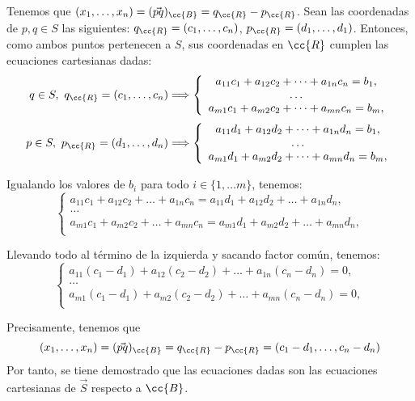 \begin{ejercicio}
    Tenemos que $(x_1,\dots,x_n)=(\vec{pq})_{\cc{B}}=q_{\cc{R}}-p_{\cc{R}}$. Sean las coordenadas de $p,q\in S$ las siguientes: $q_{\cc{R}}=(c_1,\dots,c_n)$, $p_{\cc{R}}=(d_1,\dots,d_1)$. Entonces, como ambos puntos pertenecen a $S$, sus coordenadas en $\cc{R}$ cumplen las ecuaciones cartesianas dadas:
    \begin{equation*}
        q\in S,~q_{\cc{R}}=(c_1,\dots,c_n)\Longrightarrow \left\{\begin{array}{c}
            a_{11}c_1+a_{12}c_2 + \dots + a_{1n}c_n=b_1, \\
            \dots \\
            a_{m1}c_1+a_{m2}c_2 + \dots + a_{mn}c_n=b_m, \\
        \end{array}\right.
    \end{equation*}
    \begin{equation*}
        p\in S,~p_{\cc{R}}=(d_1,\dots,d_n)\Longrightarrow\left\{\begin{array}{c}
            a_{11}d_1+a_{12}d_2 + \dots + a_{1n}d_n=b_1, \\
            \dots \\
            a_{m1}d_1+a_{m2}d_2 + \dots + a_{mn}d_n=b_m, \\
        \end{array}\right.
    \end{equation*}

    Igualando los valores de $b_i$ para todo $i\in \{1,\dots m\}$, tenemos:
    \begin{equation*}
        \left\{\begin{array}{c}
            a_{11}c_1+a_{12}c_2 + \dots + a_{1n}c_n=a_{11}d_1+a_{12}d_2 + \dots + a_{1n}d_n, \\
            \dots \\
            a_{m1}c_1+a_{m2}c_2 + \dots + a_{mn}c_n=a_{m1}d_1+a_{m2}d_2 + \dots + a_{mn}d_n, \\
        \end{array}\right.
    \end{equation*}

    Llevando todo al término de la izquierda y sacando factor común, tenemos:
    \begin{equation*}
        \left\{\begin{array}{c}
            a_{11}(c_1-d_1)+a_{12}(c_2-d_2) + \dots + a_{1n}(c_n-d_n)=0, \\
            \dots \\
            a_{m1}(c_1-d_1)+a_{m2}(c_2-d_2) + \dots + a_{mn}(c_n-d_n)=0, \\
        \end{array}\right.
    \end{equation*}
    
    Precisamente, tenemos que $$(x_1,\dots,x_n)=(\vec{pq})_{\cc{B}}=q_{\cc{R}}-p_{\cc{R}}=(c_1-d_1,\dots, c_n-d_n)$$
    Por tanto, se tiene demostrado que las ecuaciones dadas son las ecuaciones cartesianas de $\vec{S}$ respecto a $\cc{B}$.
\end{ejercicio}


